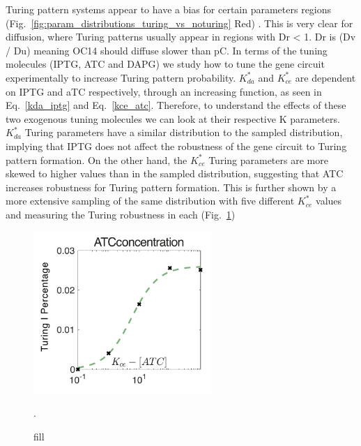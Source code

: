 Turing pattern systems appear to have a bias for certain parameters regions (Fig.~\ref{fig:param_distributions_turing_vs_noturing} Red) .
This is very clear for diffusion, where Turing patterns usually appear in regions with Dr < 1. Dr is (Dv / Du) meaning OC14 should diffuse slower than pC. %
In terms of the tuning molecules (IPTG, ATC and DAPG) we study how to tune the gene circuit experimentally to increase Turing pattern probability.
$K_{da}^*$  and $K_{ce}^*$ are dependent on IPTG and aTC respectively, through an increasing function, as seen in Eq.~\ref{kda_iptg} and Eq.~\ref{kce_atc}.
Therefore, to understand the effects of these two exogenous tuning molecules we can look at their respective K parameters.
$K_{da}^*$ Turing parameters have a similar distribution to the sampled distribution, implying that IPTG does not affect the robustness of the gene circuit to Turing pattern formation.
On the other hand, the $K_{ce}^*$ Turing parameters are more skewed to higher values than in the sampled distribution, suggesting that ATC increases robustness for Turing pattern formation.
This is further shown by a more extensive sampling of the same distribution with five different $K_{ce}^*$ values and measuring the Turing robustness in each (Fig.~\ref{fig:atc_robustness})

\begin{figure}[H] %
    \centering
    \begin{adjustbox}{center}
        \includegraphics[width=0.6\textwidth]{chapters/Chapter 2/atc_robustness} %
    \end{adjustbox}
    \caption{fill}. %
    \label{fig:atc_robustness} %
\end{figure}

